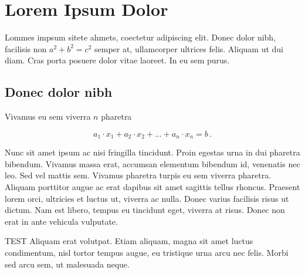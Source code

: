 ﻿%


\setcounter{chapter}{0} 

\chapter{Lorem Ipsum Dolor} \label{mychapter}

Lommes impsum sitete ahmets, coectetur adipiscing elit. Donec dolor nibh, facilisis non $a^2 + b^2 = c^2$ semper at, ullamcorper ultrices felis. Aliquam ut dui diam. Cras porta posuere dolor vitae laoreet. In eu sem purus. 

\section{Donec dolor nibh}
\label{myfirstsection}

Vivamus  eu sem viverra $n$ pharetra

\begin{equation} \label{myeq.1}
a_1\cdot x_1+a_2\cdot x_2+...+a_n\cdot x_n=b\,.
\end{equation}


Nunc sit amet ipsum ac nisi fringilla tincidunt. Proin egestas urna in dui pharetra bibendum. Vivamus massa erat, accumsan elementum bibendum id, venenatis nec leo. Sed vel mattis sem. Vivamus pharetra turpis eu sem viverra pharetra. Aliquam porttitor augue ac erat dapibus sit amet sagittis tellus rhoncus. Praesent lorem orci, ultricies et luctus ut, viverra ac nulla. Donec varius facilisis risus ut dictum. Nam est libero, tempus eu tincidunt eget, viverra at risus. Donec non erat in ante vehicula vulputate.

TEST Aliquam erat volutpat. Etiam aliquam, magna sit amet luctus condimentum, nisl tortor tempus augue, eu tristique urna arcu nec felis. Morbi sed arcu sem, ut malesuada neque.

